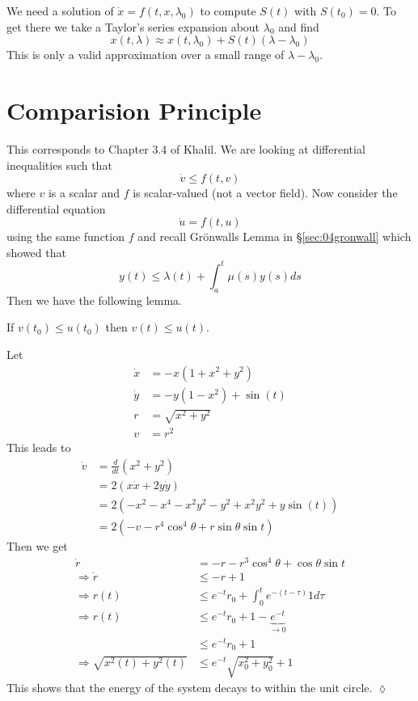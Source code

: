 We need a solution of $\dot{x}=f(t,x,\lambda_0)$ to compute $S(t)$ with $S(t_0)=0$.
To get there we take a Taylor's series expansion about $\lambda_0$ and find
$$x(t,\lambda) \approx x(t,\lambda_0) + S(t)(\lambda-\lambda_0)$$
This is only a valid approximation over a small range of $\lambda-\lambda_0$.

\section{Comparision Principle}
This corresponds to Chapter 3.4 of Khalil.
We are looking at differential inequalities such that
$$\dot{v}\leq f(t,v)$$
where $v$ is a scalar and $f$ is scalar-valued (not a vector field).
Now consider the differential equation
$$\dot{u} = f(t,u)$$
using the same function $f$ and recall Gr\"onwalls Lemma in \S\ref{sec:04gronwall} which showed that
$$y(t) \leq \lambda(t) + \int_a^t\mu(s)y(s)ds$$
Then we have the following lemma.

\begin{lemma}
If $v(t_0)\leq u(t_0)$ then $v(t)\leq u(t)$.
\end{lemma}

\begin{example}
Let
\begin{align*}
\dot{x} &= -x(1+x^2+y^2) \\
\dot{y} &= -y(1-x^2)+\sin(t) \\
r &= \sqrt{x^2+y^2} \\
v &= r^2
\end{align*}
This leads to
\begin{align*}
\dot{v} &= \frac{d}{dt}(x^2+y^2) \\
&= 2(x\dot{x}+2y\dot{y}) \\
&= 2(-x^2-x^4-x^2y^2-y^2+x^2y^2+y\sin(t)) \\
&= 2(-v-r^4\cos^4\theta+r\sin\theta\sin t)
\end{align*}
Then we get
\begin{align*}
\dot{r} &= -r-r^3\cos^4\theta+\cos\theta\sin t \\
\Rightarrow \dot{r} &\leq -r+1 \\
\Rightarrow r(t) &\leq e^{-t}r_0 + \int_0^t e^{-(t-\tau)}1d\tau \\
\Rightarrow r(t) &\leq e^{-t}r_0 + 1 - \underbrace{e^{-t}}_{\to0} \\
&\leq e^{-t}r_0 + 1 \\
\Rightarrow \sqrt{x^2(t)+y^2(t)} &\leq e^{-t}\sqrt{x_0^2+y_0^2} + 1
\end{align*}
This shows that the energy of the system decays to within the unit circle.
$\lozenge$
\end{example}
